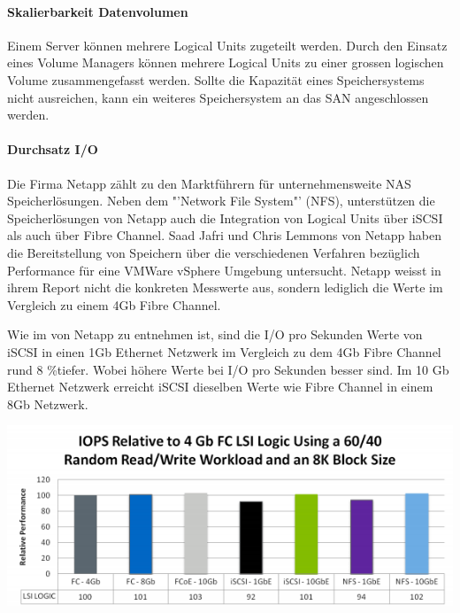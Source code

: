 \paragraph*{Skalierbarkeit Datenvolumen}
Einem Server können mehrere Logical Units zugeteilt werden. Durch den Einsatz eines Volume Managers können mehrere Logical Units zu einer grossen logischen Volume zusammengefasst werden. Sollte die Kapazität eines Speichersystems nicht ausreichen, kann ein weiteres Speichersystem an das SAN angeschlossen werden.

\paragraph*{Durchsatz I/O}\label{sec:DurchsatzIO}
Die Firma Netapp zählt zu den Marktführern für unternehmensweite NAS Speicherlösungen. Neben dem "'Network File System"' (NFS), unterstützen die Speicherlösungen von Netapp auch die Integration von Logical Units über iSCSI als auch über Fibre Channel. Saad Jafri und Chris Lemmons von Netapp haben die Bereitstellung von Speichern über die verschiedenen Verfahren bezüglich Performance für eine VMWare vSphere Umgebung untersucht. Netapp weisst in ihrem Report nicht die konkreten Messwerte aus, sondern lediglich die Werte im Vergleich zu einem 4Gb Fibre Channel.

Wie im  von Netapp zu entnehmen ist, sind die I/O pro Sekunden Werte von iSCSI in einen 1Gb Ethernet Netzwerk im Vergleich zu dem 4Gb Fibre Channel rund 8 \%tiefer. Wobei höhere Werte bei I/O pro Sekunden besser sind. Im 10 Gb Ethernet Netzwerk erreicht iSCSI dieselben Werte wie Fibre Channel in einem 8Gb Netzwerk. \cite{Jafri2011}

\begin{center}
\includegraphics[width=\linewidth, keepaspectratio = true]{media/netapp_iops.png}
\end{center}

